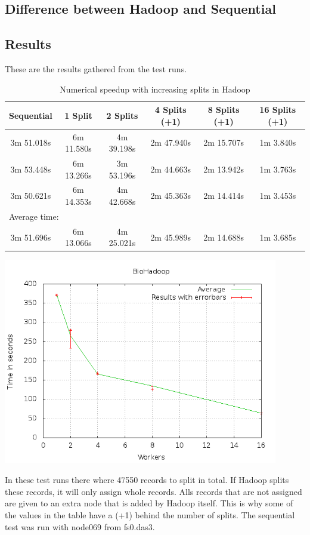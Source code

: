 \documentclass[a4paper]{article}
\begin{document}
  \subsection{Difference between Hadoop and Sequential}
  
  \subsection{Results}
    These are the results gathered from the test runs.
    \begin{table}[H]
	    \label{table:hadoop}
	    \begin{center}
		    \begin{tabular}{| c | c | c | c | c | c |}
			    \hline
			    Sequential & 1 Split & 2 Splits & 4 Splits (+1) & 8 Splits (+1) & 16 Splits (+1)\\ 
			    \hline
			    3m 51.018s & 6m 11.580s & 4m 39.198s & 2m 47.940s & 2m 15.707s & 1m 3.840s\\
			    \hline
			    3m 53.448s & 6m 13.266s & 3m 53.196s & 2m 44.663s & 2m 13.942s & 1m 3.763s\\
			    \hline
			    3m 50.621s & 6m 14.353s & 4m 42.668s & 2m 45.363s & 2m 14.414s & 1m 3.453s\\
			    \hline
			    \multicolumn{6}{|l|}{Average time:}\\
			    \hline
			    3m 51.696s & 6m 13.066s & 4m 25.021s & 2m 45.989s & 2m 14.688s & 1m 3.685s\\
			    \hline
		    \end{tabular}
  	    \caption{Numerical speedup with increasing splits in Hadoop}
	    \end{center}
    \end{table}
    \begin{center}
      \includegraphics[width=0.9\textwidth]{speedplot.png}
    \end{center}
    In these test runs there where 47550 records to split in total.
    If Hadoop splits these records, it will only assign whole records.
    Alls records that are not assigned are given to an extra node that is
    added by Hadoop itself. This is why some of the values in the table
    have a (+1) behind the number of splits.
    The sequential test was run with node069 from fs0.das3. 
\end{document}
